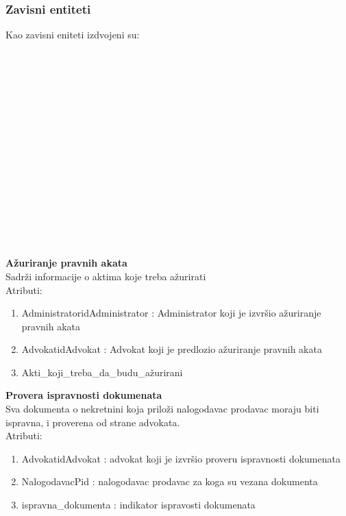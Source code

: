 \documentclass[20pt]{article}
\begin{document}
\subsubsection{\bfseries \large Zavisni entiteti}
Kao zavisni eniteti izdvojeni su:\\
\\
\\
\\
\\
\\
\\
\\
\\
\\
\\
\\
\\
\\
\\
\\
\\
\newpage
{\bfseries A\v {z}uriranje pravnih akata}\\
Sadr\v {z}i informacije o aktima koje treba a\v {z}urirati\\
\indent Atributi:
\begin{enumerate}
        \item  AdministratoridAdministrator : Administrator koji je izvr\v {s}io a\v {z}uriranje pravnih akata
        \item  AdvokatidAdvokat : Advokat koji je predlozio a\v {z}uriranje pravnih akata
        \item  Akti\_koji\_treba\_da\_budu\_a\v {z}urirani
\end{enumerate}
{\bfseries Provera ispravnosti dokumenata}\\
Sva dokumenta o nekretnini koja prilo\v {z}i nalogodavac prodavac moraju biti ispravna, i proverena od strane advokata.\\
\indent Atributi:
\begin{enumerate}
        \item  AdvokatidAdvokat : advokat koji je izvr\v {s}io proveru ispravnosti dokumenata
        \item  NalogodavacPid : nalogodavac prodavac za koga su vezana dokumenta
        \item  ispravna\_dokumenta : indikator ispravosti dokumenata
\end{enumerate}
\end{document}

